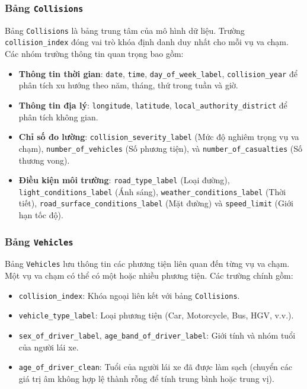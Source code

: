 \subsubsection{Bảng \texttt{Collisions}}
Bảng \texttt{Collisions} là bảng trung tâm của mô hình dữ liệu. Trường \texttt{collision\_index} đóng vai trò khóa định danh duy nhất cho mỗi vụ va chạm. Các nhóm trường thông tin quan trọng bao gồm:
\begin{itemize}
    \item \textbf{Thông tin thời gian}: \texttt{date}, \texttt{time}, \texttt{day\_of\_week\_label}, \texttt{collision\_year} để phân tích xu hướng theo năm, tháng, thứ trong tuần và giờ.
    \item \textbf{Thông tin địa lý}: \texttt{longitude}, \texttt{latitude}, \texttt{local\_authority\_district} để phân tích không gian.
    \item \textbf{Chỉ số đo lường}: \texttt{collision\_severity\_label} (Mức độ nghiêm trọng vụ va chạm), \texttt{number\_of\_vehicles} (Số phương tiện), và \texttt{number\_of\_casualties} (Số thương vong).
    \item \textbf{Điều kiện môi trường}: \texttt{road\_type\_label} (Loại đường), \texttt{light\_conditions\_label} (Ánh sáng), \texttt{weather\_conditions\_label} (Thời tiết), \texttt{road\_surface\_conditions\_label} (Mặt đường) và \texttt{speed\_limit} (Giới hạn tốc độ).
\end{itemize}

\subsubsection{Bảng \texttt{Vehicles}}
Bảng \texttt{Vehicles} lưu thông tin các phương tiện liên quan đến từng vụ va chạm. Một vụ va chạm có thể có một hoặc nhiều phương tiện. Các trường chính gồm:
\begin{itemize}
    \item \texttt{collision\_index}: Khóa ngoại liên kết với bảng \texttt{Collisions}.
    \item \texttt{vehicle\_type\_label}: Loại phương tiện (Car, Motorcycle, Bus, HGV, v.v.).
    \item \texttt{sex\_of\_driver\_label}, \texttt{age\_band\_of\_driver\_label}: Giới tính và nhóm tuổi của người lái xe.
    \item \texttt{age\_of\_driver\_clean}: Tuổi của người lái xe đã được làm sạch (chuyển các giá trị âm không hợp lệ thành rỗng để tính trung bình hoặc trung vị).
\end{itemize}

